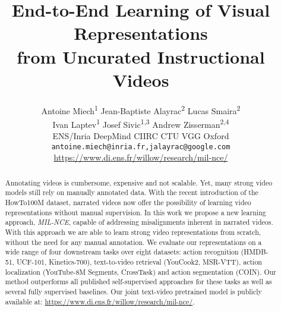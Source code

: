 \documentclass[10pt,twocolumn,letterpaper]{article}
\begin{document}
\title{End-to-End Learning of Visual Representations \\ from Uncurated Instructional Videos }
\author{
Antoine Miech\textsuperscript{1}\footnotemark[1]
	\quad\quad\quad
	Jean-Baptiste Alayrac\textsuperscript{2}\footnotemark[1]
	\quad\quad\quad
	Lucas Smaira\textsuperscript{2}
	\\
		\quad\quad
	Ivan Laptev\textsuperscript{1}
	\quad\quad\quad\quad\quad
	Josef Sivic\textsuperscript{1,3}
	\quad\quad\quad
	Andrew Zisserman\textsuperscript{2,4}
	\\
	\small{ENS/Inria \quad \normalsize{DeepMind} \small \quad CIIRC CTU \quad VGG Oxford}
	\\
	\small{\texttt{antoine.miech@inria.fr,jalayrac@google.com}}
	\\
	\small{\url{https://www.di.ens.fr/willow/research/mil-nce/}}
}


\pagestyle{plain}




\begin{abstract}
Annotating videos is cumbersome, expensive and not scalable.
Yet, many strong video models still rely on manually annotated data.
With the recent introduction of the HowTo100M dataset, narrated videos now offer the possibility of learning video representations without manual supervision.
In this work we propose a new learning approach, 
\emph{MIL-NCE}, capable of addressing misalignments inherent in narrated videos.
With this approach we are able to learn strong video representations from scratch, without the need for any manual annotation. 
We evaluate our representations on a wide range of four downstream tasks over eight datasets: action recognition (HMDB-51, UCF-101, Kinetics-700), text-to-video retrieval (YouCook2, MSR-VTT), action localization (YouTube-8M Segments, CrossTask) and action segmentation (COIN).
Our method outperforms all published self-supervised approaches for these tasks as well as several fully supervised baselines. 
Our joint text-video pretrained model is publicly available at: \url{https://www.di.ens.fr/willow/research/mil-nce/}.
\end{abstract}
\end{document}
